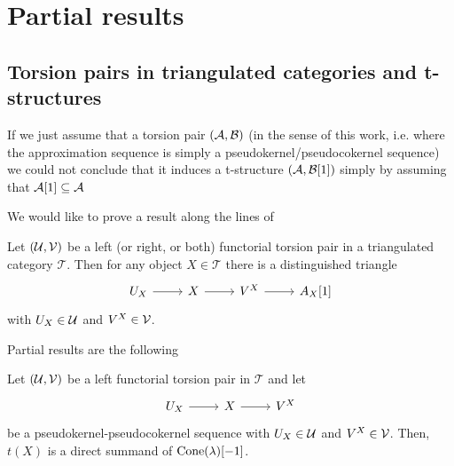 \chapter{Partial results}

\section{Torsion pairs in triangulated categories and t-structures}

If we just assume that a torsion pair $(\mathcal{A},\mathcal{B})$ (in the sense of this work, i.e. where the approximation sequence is simply a pseudokernel/pseudocokernel sequence) we could not conclude that it induces a t-structure $(\mathcal{A},\mathcal{B}[1])$ simply by assuming that $\mathcal{A}[1]\subseteq\mathcal{A}$


We would like to prove a result along the lines of

\begin{lemma}\label{lem:torsion_disinguished}
  Let $(\mathcal{U},\mathcal{V})$ be a left (or right, or both) functorial torsion pair in a triangulated category $\mathcal{T}$. Then for any object $X\in\mathcal{T}$ there is a distinguished triangle
  \begin{equation*}
    \begin{tikzcd}
      U_X\arrow{r}& X\arrow{r}&V^X\arrow{r}&A_X[1]
    \end{tikzcd}
  \end{equation*}
  with $U_X\in\mathcal{U}$ and $V^X\in\mathcal{V}$.
\end{lemma}

Partial results are the following
\begin{lemma}
  Let $(\mathcal{U},\mathcal{V})$ be a left functorial torsion pair in $\mathcal{T}$ and let
  \begin{equation*}
    \begin{tikzcd}
      U_X\arrow{r}& X\arrow{r}&V^X
    \end{tikzcd}
  \end{equation*}
  be a pseudokernel-pseudocokernel sequence with $U_X\in\mathcal{U}$ and $V^X\in\mathcal{V}$. Then, $t(X)$ is a direct summand of $\operatorname{Cone}(\lambda)[-1]$.
\end{lemma}

